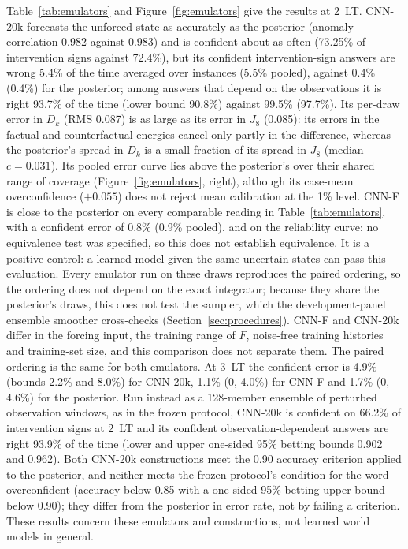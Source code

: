 \documentclass[11pt]{article}
\begin{document}
Table~\ref{tab:emulators} and Figure~\ref{fig:emulators} give the results at 2~LT. CNN-20k forecasts the unforced state as accurately as the posterior (anomaly correlation 0.982 against 0.983) and is confident about as often (73.25\% of intervention signs against 72.4\%), but its confident intervention-sign answers are wrong 5.4\% of the time averaged over instances (5.5\% pooled), against 0.4\% (0.4\%) for the posterior; among answers that depend on the observations it is right 93.7\% of the time (lower bound 90.8\%) against 99.5\% (97.7\%). Its per-draw error in $D_k$ (RMS 0.087) is as large as its error in $J_8$ (0.085): its errors in the factual and counterfactual energies cancel only partly in the difference, whereas the posterior's spread in $D_k$ is a small fraction of its spread in $J_8$ (median $c = 0.031$). Its pooled error curve lies above the posterior's over their shared range of coverage (Figure~\ref{fig:emulators}, right), although its case-mean overconfidence ($+0.055$) does not reject mean calibration at the 1\% level. CNN-F is close to the posterior on every comparable reading in Table~\ref{tab:emulators}, with a confident error of 0.8\% (0.9\% pooled), and on the reliability curve; no equivalence test was specified, so this does not establish equivalence. It is a positive control: a learned model given the same uncertain states can pass this evaluation. Every emulator run on these draws reproduces the paired ordering, so the ordering does not depend on the exact integrator; because they share the posterior's draws, this does not test the sampler, which the development-panel ensemble smoother cross-checks (Section~\ref{sec:procedures}). CNN-F and CNN-20k differ in the forcing input, the training range of $F$, noise-free training histories and training-set size, and this comparison does not separate them. The paired ordering is the same for both emulators. At 3~LT the confident error is 4.9\% (bounds 2.2\% and 8.0\%) for CNN-20k, 1.1\% (0, 4.0\%) for CNN-F and 1.7\% (0, 4.6\%) for the posterior. Run instead as a 128-member ensemble of perturbed observation windows, as in the frozen protocol, CNN-20k is confident on 66.2\% of intervention signs at 2~LT and its confident observation-dependent answers are right 93.9\% of the time (lower and upper one-sided 95\% betting bounds 0.902 and 0.962). Both CNN-20k constructions meet the 0.90 accuracy criterion applied to the posterior, and neither meets the frozen protocol's condition for the word overconfident (accuracy below 0.85 with a one-sided 95\% betting upper bound below 0.90); they differ from the posterior in error rate, not by failing a criterion. These results concern these emulators and constructions, not learned world models in general.
\end{document}
